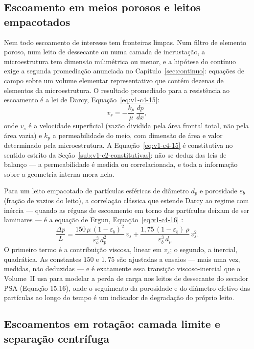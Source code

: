 \documentclass[12pt,a4paper]{article}
\numberwithin{equation}{section}
\numberwithin{table}{section}
\numberwithin{figure}{section}
\begin{document}
\subsection{Escoamento em meios porosos e leitos
empacotados}\label{sub:v1-c4-poroso}

Nem todo escoamento de interesse tem fronteiras limpas. Num filtro de
elemento poroso, num leito de dessecante ou numa camada de incrustação, a
microestrutura tem dimensão milimétrica ou menor, e a hipótese do contínuo
exige a segunda promediação anunciada no
Capítulo~\ref{sec:continuo}: equações de campo sobre um volume elementar
representativo que contém dezenas de elementos da microestrutura. O resultado
promediado para a resistência ao escoamento é a lei de Darcy,
Equação~\eqref{eq:v1-c4-15}:
\begin{equation}\label{eq:v1-c4-15}
v_s = -\frac{k_p}{\mu}\,\frac{dp}{dx},
\end{equation}
onde $v_s$ é a velocidade superficial (vazão dividida pela área frontal total,
não pela área vazia) e $k_p$ a permeabilidade do meio, com dimensão de área e
valor determinado pela microestrutura. A Equação~\eqref{eq:v1-c4-15} é
constitutiva no sentido estrito da
Seção~\ref{sub:v1-c2-constitutivas}: não se deduz das leis de balanço --- a
permeabilidade é medida ou correlacionada, e toda a informação sobre a
geometria interna mora nela.

Para um leito empacotado de partículas esféricas de diâmetro $d_p$ e
porosidade $\varepsilon_b$ (fração de vazios do leito), a correlação clássica
que estende Darcy ao regime com inércia --- quando as réguas de escoamento em
torno das partículas deixam de ser laminares --- é a equação de Ergun,
Equação~\eqref{eq:v1-c4-16} \cite{white2011}:
\begin{equation}\label{eq:v1-c4-16}
\frac{\Delta p}{L} = \frac{150\,\mu\,(1-\varepsilon_b)^2}{\varepsilon_b^3\, d_p^2}\,v_s
+ \frac{1{,}75\,(1-\varepsilon_b)\,\rho}{\varepsilon_b^3\, d_p}\,v_s^2 .
\end{equation}
O primeiro termo é a contribuição viscosa, linear em $v_s$; o segundo, a
inercial, quadrática. As constantes $150$ e $1{,}75$ são ajustadas a ensaios
--- mais uma vez, medidas, não deduzidas --- e é exatamente essa transição
viscoso-inercial que o Volume~II usa para modelar a perda de carga nos
leitos de dessecante do secador PSA (Equação 15.16), onde o seguimento da
porosidade e do diâmetro efetivo das partículas ao longo do tempo é um
indicador de degradação do próprio leito.

\subsection{Escoamentos em rotação: camada limite e separação
centrífuga}\label{sub:v1-c4-rotativo}
\end{document}
